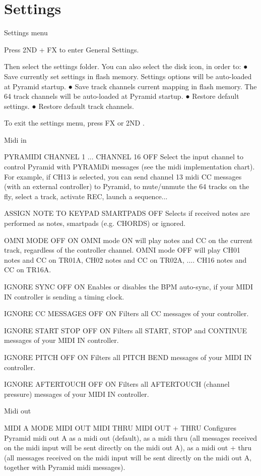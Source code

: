 \chapter{Settings}

Settings menu

Press  2ND  + FX to enter General Settings. 



Then select the settings folder. You can also select the disk icon, in order to:
● Save currently set settings in flash memory. Settings options will be auto-loaded at Pyramid startup. 
● Save track channels current mapping in flash memory. The 64 track channels will be auto-loaded at Pyramid startup. 
● Restore default settings. 
● Restore default track channels.

To exit the settings menu, press FX or  2ND .

Midi in

 PYRAMIDI   CHANNEL 1   ...   CHANNEL 16   OFF 
Select the input channel to control Pyramid with PYRAMiDi messages (see the midi implementation chart). For example, if CH13 is selected, you can send channel 13 midi CC messages (with an external controller) to Pyramid, to mute/unmute the 64 tracks on the fly, select a track, activate REC, launch a sequence...

 ASSIGN NOTE TO   KEYPAD   SMARTPADS   OFF 
Selects if received notes are performed as notes, smartpads (e.g. CHORDS) or ignored.

 OMNI MODE   OFF   ON 
OMNI mode ON will play notes and CC on the current track, regardless of the controller channel. OMNI mode OFF will play CH01 notes and CC on TR01A, CH02 notes and CC on TR02A, .... CH16 notes and CC on TR16A. 

 IGNORE SYNC   OFF   ON 
Enables or disables the BPM auto-sync, if your MIDI IN controller is sending a timing clock.

 IGNORE CC MESSAGES   OFF   ON 
Filters all CC messages of your controller.

 IGNORE START STOP   OFF   ON 
Filters all START, STOP and CONTINUE messages of your MIDI IN controller.

 IGNORE PITCH   OFF   ON 
Filters all PITCH BEND messages of your MIDI IN controller.

 IGNORE AFTERTOUCH   OFF   ON  
Filters all AFTERTOUCH (channel pressure) messages of your MIDI IN controller.

Midi out

 MIDI A MODE   MIDI OUT   MIDI THRU   MIDI OUT + THRU 
Configures Pyramid midi out A as a midi out (default), as a midi thru (all messages received on the midi input will be sent directly on the midi out A), as a midi out + thru (all messages received on the midi input will be sent directly on the midi out A, together with Pyramid midi messages). 

